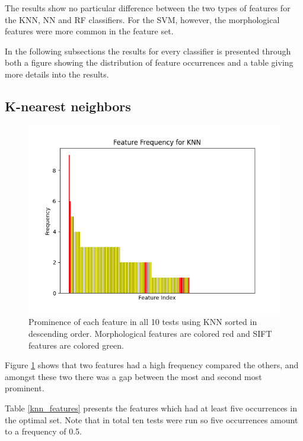 \documentclass{kththesis}
\begin{document}
The results show no particular difference between the two types of features for the KNN, NN and RF classifiers. For the SVM, however, the morphological features were more common in the feature set.

In the following subsections the results for every classifier is presented through both a figure showing the distribution of feature occurrences and a table giving more details into the results.

\subsection{K-nearest neighbors}


\begin{figure}[h!]
  \centering
  \includegraphics[scale=0.8]{figures/knn_all_freqs.png}
  \caption{Prominence of each feature in all 10 tests using KNN sorted in descending order. Morphological features are colored red and SIFT features are colored green.}
  \label{fig:freq_knn}
\end{figure}

\newpage

Figure \ref{fig:freq_knn} shows that two features had a high frequency compared the others, and amongst these two there was a gap between the most and second most prominent.

Table \ref{knn_features} presents the features which had at least five occurrences in the optimal set. Note that in total ten tests were run so five occurrences amount to a frequency of 0.5.
\end{document}
